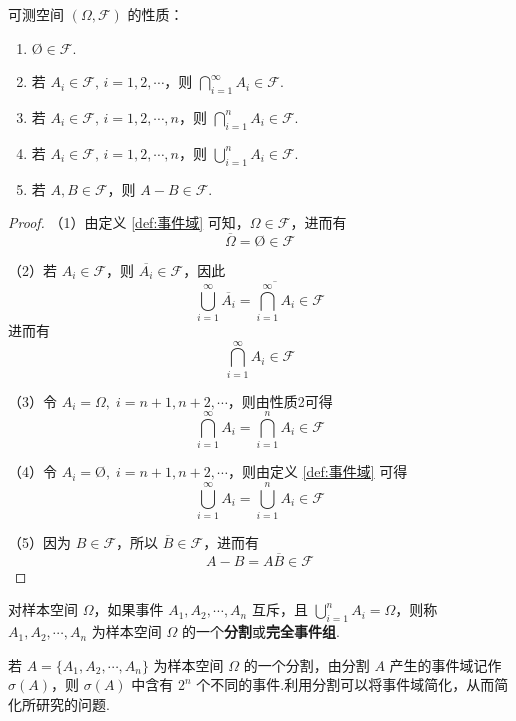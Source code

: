 \begin{property}
    \indent 可测空间 $(\varOmega, \mathcal{F})$ 的性质：
    \begin{enumerate}
        \item $\text{\O} \in \mathcal{F}$.
        \item 若 $A_i \in \mathcal{F}, \, i=1,2,\cdots$，则 $\displaystyle\bigcap_{i=1}^{\infty} A_i \in \mathcal{F}$.
        \item 若 $A_i \in \mathcal{F}, \, i=1,2,\cdots,n$，则 $\displaystyle\bigcap_{i=1}^n A_i \in \mathcal{F}$.
        \item 若 $A_i \in \mathcal{F}, \, i=1,2,\cdots,n$，则 $\displaystyle\bigcup_{i=1}^n A_i \in \mathcal{F}$.
        \item 若 $A,B \in \mathcal{F}$，则 $A-B \in \mathcal{F}$.
    \end{enumerate}
\end{property}

\begin{proof}
    （1）由定义 \ref{def:事件域} 可知，$\varOmega \in \mathcal{F}$，进而有
    $$
    \overline{\varOmega} = \text{\O} \in \mathcal{F}
    $$

    （2）若 $A_i \in \mathcal{F}$，则 $\overline{A_i} \in \mathcal{F}$，因此
    $$
    \bigcup_{i=1}^{\infty} \overline{A_i} = \overline{\bigcap_{i=1}^{\infty} A_i} \in \mathcal{F}
    $$
    进而有
    $$
    \bigcap_{i=1}^{\infty} A_i \in \mathcal{F}
    $$

    （3）令 $A_{i} = \varOmega,\; i = n+1, n+2, \cdots$，则由性质2可得
    $$
    \bigcap_{i=1}^{\infty} A_i = \bigcap_{i=1}^{n} A_i \in \mathcal{F}
    $$

    （4）令 $A_{i} = \text{\O},\; i = n+1, n+2, \cdots$，则由定义 \ref{def:事件域} 可得
    $$
    \bigcup_{i=1}^{\infty} A_i = \bigcup_{i=1}^{n} A_i \in \mathcal{F}
    $$

    （5）因为 $B \in \mathcal{F}$，所以 $\overline{B} \in \mathcal{F}$，进而有
    $$
    A-B = A \overline{B} \in \mathcal{F}
    $$
\end{proof}

\begin{definition}
    \indent 对样本空间 $\varOmega$，如果事件 $A_1,A_2,\cdots,A_n$ 互斥，且 $\displaystyle\bigcup_{i=1}^n A_i=\varOmega$，则称 $A_1,A_2,\cdots,A_n$ 为样本空间 $\varOmega$ 的一个\textbf{分割}或\textbf{完全事件组}.
\end{definition}

若 $A = \{ A_1,A_2,\cdots,A_n \}$ 为样本空间 $\varOmega$ 的一个分割，由分割 $A$ 产生的事件域记作 $\sigma(A)$，则 $\sigma(A)$ 中含有 $2^n$ 个不同的事件.利用分割可以将事件域简化，从而简化所研究的问题.

